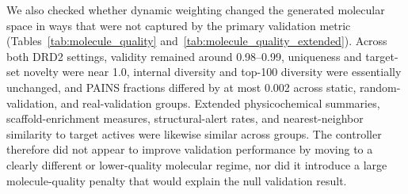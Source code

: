 \documentclass[referee,lineno,pdflatex,sn-basic]{sn-jnl}
\theoremstyle{thmstyleone}%
\theoremstyle{thmstyletwo}%
\theoremstyle{thmstylethree}%
\begin{document}
We also checked whether dynamic weighting changed the generated molecular space in ways that were not captured by the primary validation metric (Tables~\ref{tab:molecule_quality} and~\ref{tab:molecule_quality_extended}). Across both DRD2 settings, validity remained around 0.98--0.99, uniqueness and target-set novelty were near 1.0, internal diversity and top-100 diversity were essentially unchanged, and PAINS fractions differed by at most 0.002 across static, random-validation, and real-validation groups. Extended physicochemical summaries, scaffold-enrichment measures, structural-alert rates, and nearest-neighbor similarity to target actives were likewise similar across groups. The controller therefore did not appear to improve validation performance by moving to a clearly different or lower-quality molecular regime, nor did it introduce a large molecule-quality penalty that would explain the null validation result.
\end{document}
